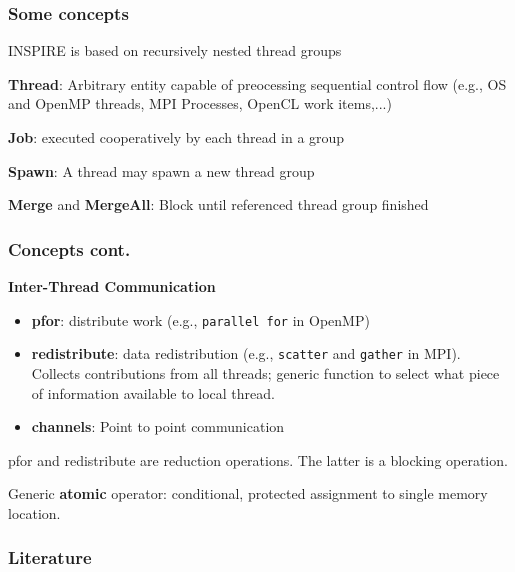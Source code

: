 \documentclass{beamer}
\newcommand\fB[1]{\textcolor{blue!80!black}{\textbf{#1}}}
\begin{document}
\begin{frame}
\frametitle{Some concepts}
INSPIRE is based on recursively nested thread groups

\bigskip
\fB{Thread}: Arbitrary entity capable of preocessing sequential control flow (e.g., OS and OpenMP threads, MPI Processes, OpenCL work items,...)

\bigskip
\fB{Job}: executed cooperatively by each thread in a group

\bigskip
\fB{Spawn}: A thread may spawn a new thread group

\bigskip
\fB{Merge} and \fB{MergeAll}: Block until referenced thread group finished 
\end{frame}

\begin{frame}
\frametitle{Concepts cont.}
\fB{Inter-Thread Communication}
\begin{itemize}
\item \fB{pfor}: distribute work (e.g., \texttt{parallel for} in OpenMP)
\item \fB{redistribute}: data redistribution (e.g., \texttt{scatter} and \texttt{gather} in MPI). Collects contributions from all threads; generic function to select what piece of information available to local thread.
\item \fB{channels}: Point to point communication
\end{itemize}

\bigskip
pfor and redistribute are reduction operations. The latter is a blocking operation.

\bigskip\pause
Generic \fB{atomic} operator: conditional, protected assignment to single memory location.
\end{frame}



\begin{frame}[allowframebreaks]
\frametitle<presentation>{Literature}    
\printbibliography
\end{frame} 	 
\end{document}
